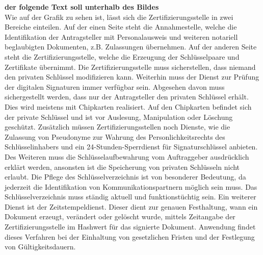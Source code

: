 \pagebreak
\textbf{der folgende Text soll unterhalb des Bildes}\\
Wie auf der Grafik zu sehen ist, lässt sich die Zertifizierungsstelle in zwei Bereiche einteilen. Auf der einen Seite steht die Annahmestelle, welche die Identifikation der Antragsteller mit Personalausweis und weiteren notariell beglaubigten Dokumenten, z.B. Zulassungen übernehmen. Auf der anderen Seite steht die Zertifizierungsstelle, welche die Erzeugung der Schlüsselpaare und Zertifikate übernimmt. Die Zertifizierungsstelle muss sicherstellen, dass niemand den privaten Schlüssel modifizieren kann. Weiterhin muss der Dienst zur Prüfung der digitalen Signaturen immer verfügbar sein. Abgesehen davon muss sichergestellt werden, dass nur der Antragsteller den privaten Schlüssel erhält. Dies wird meistens mit Chipkarten realisiert. Auf den Chipkarten befindet sich der private Schlüssel und ist vor Auslesung, Manipulation oder Löschung geschützt. Zusätzlich müssen Zertifizierungsstellen noch Dienste, wie die Zulassung von Pseudonyme zur Wahrung des Personlichkeitsrechts des Schlüsselinhabers und ein 24-Stunden-Sperrdienst für Signaturschlüssel anbieten. Des Weiteren muss die Schlüsselaufbewahrung vom Auftraggeber ausdrücklich erklärt werden, ansonsten ist die Speicherung von privaten Schlüsseln nicht erlaubt. Die Pflege des Schlüsselverzeichnis ist von besonderer Bedeutung, da jederzeit die Identifikation von Kommunikationspartnern möglich sein muss. Das Schlüsselverzeichnis muss ständig aktuell und funktionstüchtig sein. Ein weiterer Dienst ist der Zeitstempeldienst. Dieser dient zur genauen Festhaltung, wann ein Dokument erzeugt, verändert oder gelöscht wurde, mittels Zeitangabe der Zertifizierungsstelle im Hashwert für das signierte Dokument. Anwendung findet dieses Verfahren bei der Einhaltung von gesetzlichen Fristen und der Festlegung von Gültigkeitsdauern. \cite{standdeswissens3}\cite{zertstelle1}